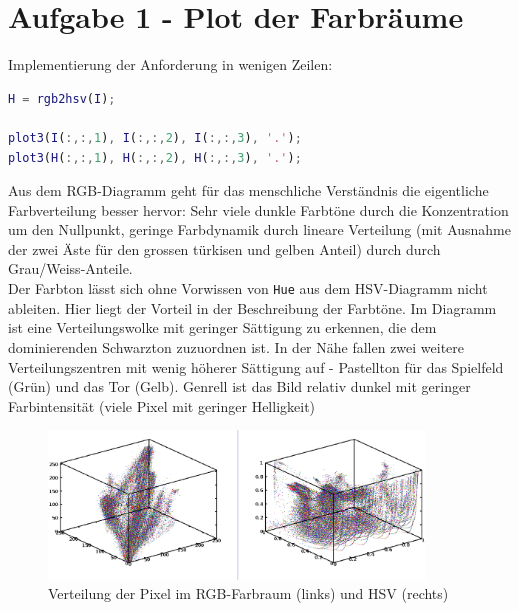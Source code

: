 



\newcommand{\nr}{6}
\lstset{language=matlab}



\section*{Aufgabe 1 - Plot der Farbr\"aume}
Implementierung der Anforderung in wenigen Zeilen:
\begin{lstlisting}[language=matlab,caption=Approxiamation der vier neuen Pixel]
H = rgb2hsv(I);

plot3(I(:,:,1), I(:,:,2), I(:,:,3), '.');
plot3(H(:,:,1), H(:,:,2), H(:,:,3), '.');
\end{lstlisting}

Aus dem RGB-Diagramm geht f\"ur das menschliche Verst\"andnis die eigentliche
Farbverteilung besser hervor: Sehr viele dunkle Farbt\"one durch die Konzentration
um den Nullpunkt, geringe Farbdynamik durch lineare Verteilung (mit Ausnahme der 
zwei \"Aste f\"ur den grossen t\"urkisen und gelben Anteil) durch durch Grau/Weiss-Anteile. \\
Der Farbton l\"asst sich ohne Vorwissen von \texttt{Hue} aus dem HSV-Diagramm nicht
ableiten. Hier liegt der Vorteil in der Beschreibung der Farbt\"one. Im Diagramm ist
eine Verteilungswolke mit geringer S\"attigung  zu erkennen, die dem
dominierenden Schwarzton zuzuordnen ist. In der N\"ahe fallen zwei weitere Verteilungszentren mit wenig h\"oherer S\"attigung auf - Pastellton f\"ur das Spielfeld (Gr\"un) und das Tor (Gelb). Genrell ist das Bild relativ dunkel mit geringer Farbintensit\"at (viele Pixel mit geringer Helligkeit)

\begin{figure}[H]
\begin{center}
\includegraphics[width=100mm]{u08/graphs.eps}
\end{center}
\caption{Verteilung der Pixel im RGB-Farbraum (links) und HSV (rechts)}
\end{figure}



